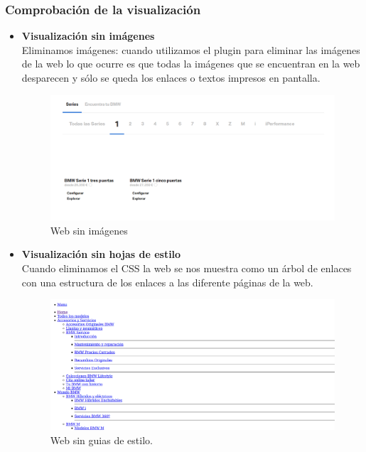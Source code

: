 \documentclass[a4paper,11pt]{article}
\begin{document}
\subsubsection{Comprobación de la visualización}
\begin{itemize}
  \item \textbf{Visualización sin imágenes}\\
  Eliminamos imágenes: cuando utilizamos el plugin para eliminar las imágenes de la web lo que ocurre es que todas la imágenes que se encuentran en la web desparecen y sólo se queda los enlaces o textos impresos en pantalla.\\
\begin{figure}[H]
  \centering
  \includegraphics[scale=0.35]{web_sin_imagen.png}
  \caption{Web sin imágenes}
  \label{fig:nimage}
\end{figure}

  \item \textbf{Visualización sin hojas de estilo}\\
  Cuando eliminamos el CSS la web se nos muestra como un árbol de enlaces con una estructura de los enlaces a las diferente páginas de la web.
  \begin{figure}[H]
    \centering
    \includegraphics[scale=0.35]{web_sin_css.png}
    \caption{Web sin guias de estilo.}
    \label{fig:nicss}
  \end{figure}


\end{itemize}
\end{document}
